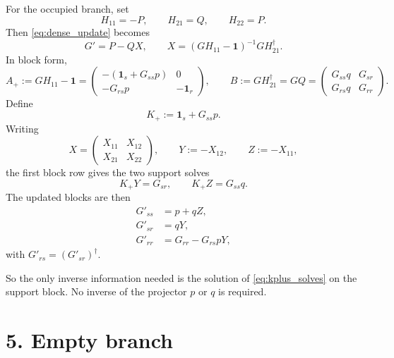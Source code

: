 \documentclass[11pt]{article}
\newcommand{\I}{\mathbf{1}}
\begin{document}
For the occupied branch, set
\begin{equation}
H_{11} = -P, \qquad H_{21} = Q, \qquad H_{22} = P.
\end{equation}
Then \eqref{eq:dense_update} becomes
\begin{equation}
G' = P - QX, \qquad X = (GH_{11} - \I)^{-1} G H_{21}^\dagger.
\end{equation}
In block form,
\begin{equation}
A_+ := GH_{11} - \I =
\begin{pmatrix}
-(\I_s + G_{ss}p) & 0 \\
-G_{rs}p & -\I_r
\end{pmatrix},
\qquad
B := GH_{21}^\dagger = GQ =
\begin{pmatrix}
G_{ss}q & G_{sr} \\
G_{rs}q & G_{rr}
\end{pmatrix}.
\end{equation}
Define
\begin{equation}
K_+ := \I_s + G_{ss}p.
\end{equation}
Writing
\begin{equation}
X =
\begin{pmatrix}
X_{11} & X_{12} \\
X_{21} & X_{22}
\end{pmatrix},
\qquad
Y := -X_{12},
\qquad
Z := -X_{11},
\end{equation}
the first block row gives the two support solves
\begin{equation}
K_+ Y = G_{sr},
\qquad
K_+ Z = G_{ss}q.
\label{eq:kplus_solves}
\end{equation}
The updated blocks are then
\begin{align}
G'_{ss} &= p + qZ, \\
G'_{sr} &= qY, \\
G'_{rr} &= G_{rr} - G_{rs}pY,
\end{align}
with $G'_{rs} = (G'_{sr})^\dagger$.

So the only inverse information needed is the solution of
\eqref{eq:kplus_solves} on the support block. No inverse of the projector $p$ or
$q$ is required.

\section*{5. Empty branch}
\end{document}

